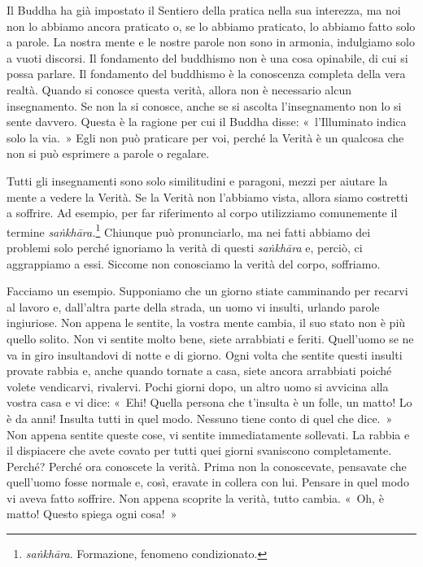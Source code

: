 Il Buddha ha già impostato il Sentiero della pratica nella sua
interezza, ma noi non lo abbiamo ancora praticato o, se lo abbiamo
praticato, lo abbiamo fatto solo a parole. La nostra mente e le nostre
parole non sono in armonia, indulgiamo solo a vuoti discorsi. Il
fondamento del buddhismo non è una cosa opinabile, di cui si possa
parlare. Il fondamento del buddhismo è la conoscenza completa della vera
realtà. Quando si conosce questa verità, allora non è necessario alcun
insegnamento. Se non la si conosce, anche se si ascolta l'insegnamento
non lo si sente davvero. Questa è la ragione per cui il Buddha disse:
«~l'Illuminato indica solo la via.~» Egli non può praticare per voi,
perché la Verità è un qualcosa che non si può esprimere a parole o
regalare.

Tutti gli insegnamenti sono solo similitudini e paragoni, mezzi per
aiutare la mente a vedere la Verità. Se la Verità non l'abbiamo vista,
allora siamo costretti a soffrire. Ad esempio, per far riferimento al
corpo utilizziamo comunemente il termine \emph{saṅkhāra.}\footnote{\emph{saṅkhāra}.
  Formazione, fenomeno condizionato.} Chiunque può pronunciarlo, ma nei
fatti abbiamo dei problemi solo perché ignoriamo la verità di questi
\emph{saṅkhāra} e, perciò, ci aggrappiamo a essi. Siccome non conosciamo
la verità del corpo, soffriamo.

Facciamo un esempio. Supponiamo che un giorno stiate camminando per
recarvi al lavoro e, dall'altra parte della strada, un uomo vi insulti,
urlando parole ingiuriose. Non appena le sentite, la vostra mente
cambia, il suo stato non è più quello solito. Non vi sentite molto bene,
siete arrabbiati e feriti. Quell'uomo se ne va in giro insultandovi di
notte e di giorno. Ogni volta che sentite questi insulti provate rabbia
e, anche quando tornate a casa, siete ancora arrabbiati poiché volete
vendicarvi, rivalervi. Pochi giorni dopo, un altro uomo si avvicina alla
vostra casa e vi dice: «~Ehi! Quella persona che t'insulta è un folle,
un matto! Lo è da anni! Insulta tutti in quel modo. Nessuno tiene conto
di quel che dice.~» Non appena sentite queste cose, vi sentite
immediatamente sollevati. La rabbia e il dispiacere che avete covato per
tutti quei giorni svaniscono completamente. Perché? Perché ora conoscete
la verità. Prima non la conoscevate, pensavate che quell'uomo fosse
normale e, così, eravate in collera con lui. Pensare in quel modo vi
aveva fatto soffrire. Non appena scoprite la verità, tutto cambia. «~Oh,
è matto! Questo spiega ogni cosa!~»

